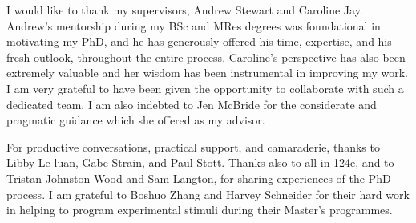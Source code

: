 I would like to thank my supervisors, Andrew Stewart and Caroline Jay. Andrew’s mentorship during my BSc and MRes degrees was foundational in motivating my PhD, and he has generously offered his time, expertise, and his fresh outlook, throughout the entire process. Caroline's perspective has also been extremely valuable and her wisdom has been instrumental in improving my work. I am very grateful to have been given the opportunity to collaborate with such a dedicated team. I am also indebted to Jen McBride for the considerate and pragmatic guidance which she offered as my advisor.  

For productive conversations, practical support, and camaraderie, thanks to Libby Le-luan, Gabe Strain, and Paul Stott. Thanks also to all in 124e, and to Tristan Johnston-Wood and Sam Langton, for sharing experiences of the PhD process. I am grateful to Boshuo Zhang and Harvey Schneider for their hard work in helping to program experimental stimuli during their Master’s programmes.